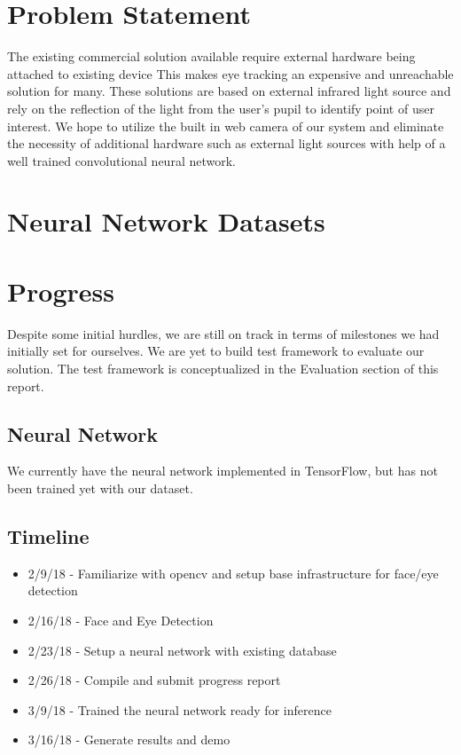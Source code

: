 \documentclass[10pt,twocolumn,letterpaper]{article}
\begin{document}
\section{Problem Statement}
The existing commercial solution available require external hardware
being attached to existing device\cite{eyetrackerlist}\cite{tobii_1} This makes eye tracking an
expensive and unreachable solution for many. These solutions are based
on external infrared light source and rely on the reflection of the
light from the user’s pupil to identify point of user interest. We hope to
utilize the built in web camera of our system and eliminate the necessity
of additional hardware such as external light sources with help of a
well trained convolutional neural network.


\section{Neural Network Datasets}
\section{Progress}
Despite some initial hurdles, we are still on track in terms of milestones 
we had initially set for ourselves. We are yet to build test framework 
to evaluate our solution. The test framework is conceptualized 
in the Evaluation section of this report.

\subsection{Neural Network}
We currently have the neural network implemented in TensorFlow, but
has not been trained yet with our dataset.

\subsection{Timeline}
\begin{itemize}
  \item 2/9/18 - Familiarize with opencv and setup base infrastructure for face/eye detection
  \item 2/16/18 - Face and Eye Detection
  \item 2/23/18 - Setup a neural network with existing database
  \item 2/26/18 - Compile and submit progress report
  \item 3/9/18 - Trained the neural network ready for inference 
  \item 3/16/18 - Generate results and demo
\end{itemize}
\end{document}
